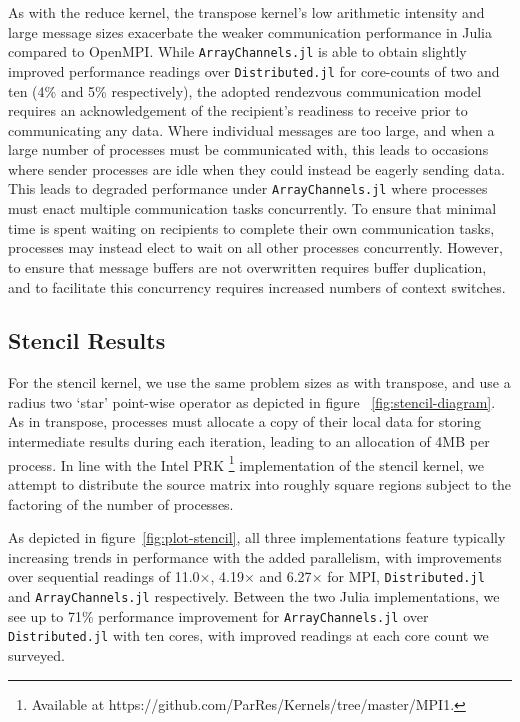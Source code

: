 \documentclass{juliacon}
\begin{document}
As with the reduce kernel, the transpose kernel's low arithmetic
intensity and large message sizes exacerbate the weaker communication
performance in Julia compared to OpenMPI. While
\texttt{ArrayChannels.jl} is able to obtain slightly improved
performance readings over \texttt{Distributed.jl} for core-counts of two
and ten (4\% and 5\% respectively), the adopted rendezvous communication
model requires an acknowledgement of the recipient's readiness to
receive prior to communicating any data. Where individual messages are
too large, and when a large number of processes must be communicated
with, this leads to occasions where sender processes are idle when they
could instead be eagerly sending data. This leads to degraded
performance under \texttt{ArrayChannels.jl} where processes must enact
multiple communication tasks concurrently. To ensure that minimal time
is spent waiting on recipients to complete their own communication
tasks, processes may instead elect to wait on all other processes
concurrently. However, to ensure that message buffers are not
overwritten requires buffer duplication, and to facilitate this
concurrency requires increased numbers of context switches.

\subsection{Stencil Results}
\label{sec:stencil}

For the stencil kernel, we use the same problem sizes as with transpose,
and use a radius two `star' point-wise operator as depicted in figure
~\ref{fig:stencil-diagram}. As in transpose, processes must allocate a
copy of their local data for storing intermediate results during each
iteration, leading to an allocation of 4MB per process. In line with the
Intel PRK \footnote{Available at
	https://github.com/ParRes/Kernels/tree/master/MPI1.} implementation of
the stencil kernel, we attempt to distribute the source matrix into
roughly square regions subject to the factoring of the number of
processes.

As depicted in figure~\ref{fig:plot-stencil}, all three implementations feature typically increasing trends in
performance with the added parallelism, with improvements over
sequential readings of 11.0\(\times\), 4.19\(\times\) and 6.27\(\times\)
for MPI, \texttt{Distributed.jl} and \texttt{ArrayChannels.jl}
respectively. Between the two Julia implementations, we see up to 71\%
performance improvement for \texttt{ArrayChannels.jl} over
\texttt{Distributed.jl} with ten cores, with improved readings at each
core count we surveyed.
\end{document}
